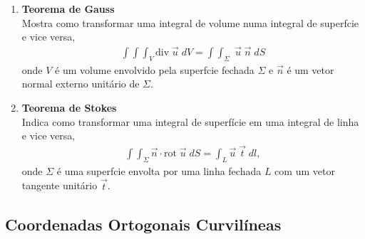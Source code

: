 \begin{enumerate}
\item {\bf Teorema de Gauss}\\
Mostra como transformar uma integral de volume numa integral de
superf\ih cie e vice versa,
\begin{eqnarray}
\int\!\!\!\int\!\!\!\int_{V} \mbox{div}\; \vec{u}\; dV = \int\!\!\!\int_{\Sigma}\; \vec{u}\;  \vec{n}\; dS
\end{eqnarray}
onde $V$ \'e um volume envolvido pela superf\ih cie fechada
$\Sigma$ e $\vec{n}$ \'e um vetor normal externo unit\'ario de
$\Sigma$.

\item {\bf Teorema de Stokes}\\
Indica como transformar uma integral de superf\'icie em uma
integral de linha e vice versa,
\begin{eqnarray}
\int\!\!\!\int_{\Sigma}\vec{n}\cdot\mbox{rot}\; \vec{u}\; dS = \int_{L}\vec{u}\; \vec{t}\; dl,
\end{eqnarray}
onde $\Sigma$ \'e uma superf\ih cie envolta por uma linha fechada
$L$ com um vetor tangente unit\'ario $\vec{t}$.

\end{enumerate}

\subsection {Coordenadas Ortogonais Curvil\'ineas}

